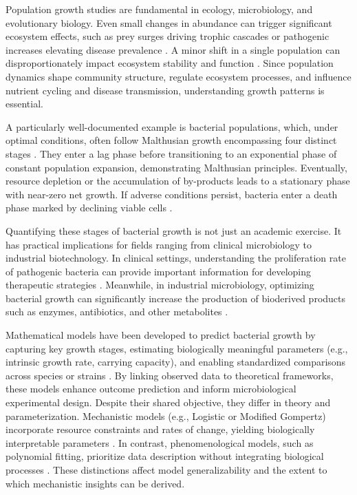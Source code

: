 \documentclass{article}
\begin{document}
Population growth studies are fundamental in ecology, microbiology, and evolutionary biology. Even small changes in abundance can trigger significant ecosystem effects, such as prey surges driving trophic cascades or pathogenic increases elevating disease prevalence \citep{Francesco2021}. A minor shift in a single population can disproportionately impact ecosystem stability and function \citep{Corey2024}. Since population dynamics shape community structure, regulate ecosystem processes, and influence nutrient cycling and disease transmission, understanding growth patterns is essential.



A particularly well-documented example is bacterial populations, which, under optimal conditions, often follow Malthusian growth encompassing four distinct stages \citep{Allen2019}. They enter a lag phase before transitioning to an exponential phase of constant population expansion, demonstrating Malthusian principles. Eventually, resource depletion or the accumulation of by-products leads to a stationary phase with near-zero net growth. If adverse conditions persist, bacteria enter a death phase marked by declining viable cells \citep{Gonzalez2023}.

Quantifying these stages of bacterial growth is not just an academic exercise. It has practical implications for fields ranging from clinical microbiology to industrial biotechnology. In clinical settings, understanding the proliferation rate of pathogenic bacteria can provide important information for developing therapeutic strategies \citep{Váradi2017}. Meanwhile, in industrial microbiology, optimizing bacterial growth can significantly increase the production of bioderived products such as enzymes, antibiotics, and other metabolites \citep{Vithalani2024}.


Mathematical models have been developed to predict bacterial growth by capturing key growth stages, estimating biologically meaningful parameters (e.g., intrinsic growth rate, carrying capacity), and enabling standardized comparisons across species or strains \citep{López2004}. By linking observed data to theoretical frameworks, these models enhance outcome prediction and inform microbiological experimental design. Despite their shared objective, they differ in theory and parameterization. Mechanistic models (e.g., Logistic or Modified Gompertz) incorporate resource constraints and rates of change, yielding biologically interpretable parameters \citep{Jianlong2024}. In contrast, phenomenological models, such as polynomial fitting, prioritize data description without integrating biological processes \citep{Estefania2024}. These distinctions affect model generalizability and the extent to which mechanistic insights can be derived.
\end{document}
